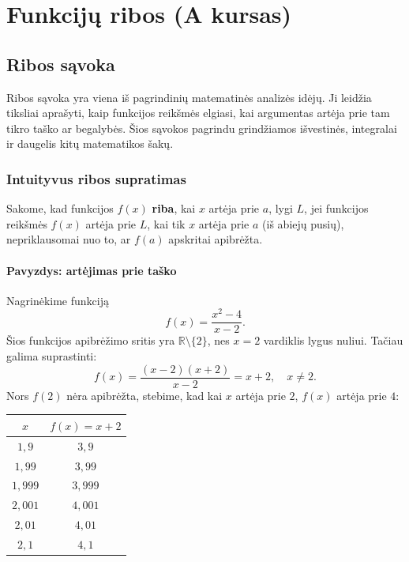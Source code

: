 \chapter{Funkcijų ribos (A kursas)}

\section{Ribos sąvoka}

Ribos sąvoka yra viena iš pagrindinių matematinės analizės idėjų. Ji leidžia tiksliai aprašyti, kaip funkcijos reikšmės elgiasi, kai argumentas artėja prie tam tikro taško ar begalybės. Šios sąvokos pagrindu grindžiamos išvestinės, integralai ir daugelis kitų matematikos šakų.

\subsection{Intuityvus ribos supratimas}

\begin{tcolorbox}[colback=blue!5!white, colframe=blue!50!black, title=Pagrindinė idėja]
Sakome, kad funkcijos $f(x)$ \textbf{riba}, kai $x$ artėja prie $a$, lygi $L$, jei funkcijos reikšmės $f(x)$ artėja prie $L$, kai tik $x$ artėja prie $a$ (iš abiejų pusių), nepriklausomai nuo to, ar $f(a)$ apskritai apibrėžta.
\end{tcolorbox}

\subsubsection*{Pavyzdys: artėjimas prie taško}

Nagrinėkime funkciją
\[
    f(x) = \frac{x^2 - 4}{x - 2}.
\]
Šios funkcijos apibrėžimo sritis yra $\mathbb{R} \setminus \{2\}$, nes $x = 2$ vardiklis lygus nuliui. Tačiau galima suprastinti:
\[
    f(x) = \frac{(x-2)(x+2)}{x-2} = x + 2, \quad x \neq 2.
\]
Nors $f(2)$ nėra apibrėžta, stebime, kad kai $x$ artėja prie $2$, $f(x)$ artėja prie $4$:

\begin{center}
\begin{tabular}{c|c}
    $x$ & $f(x) = x + 2$ \\
    \hline
    $1{,}9$ & $3{,}9$ \\
    $1{,}99$ & $3{,}99$ \\
    $1{,}999$ & $3{,}999$ \\
    $2{,}001$ & $4{,}001$ \\
    $2{,}01$ & $4{,}01$ \\
    $2{,}1$ & $4{,}1$ \\
\end{tabular}
\end{center}

